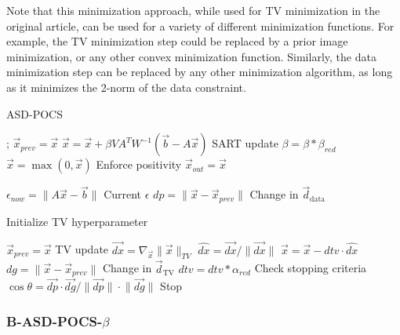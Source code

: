 Note that this minimization approach, while used for TV minimization in the original article, can be used for a variety of different minimization functions. For example, the TV minimization step could be replaced by a prior image minimization\cite{chen2008prior}, or any other convex minimization function. Similarly, the data minimization step can be replaced by any other minimization algorithm, as long as it minimizes the 2-norm of the data constraint.
\begin{algorithm}

\caption{ASD-POCS
\label{alg:ASD-POCS}}
\begin{algorithmic}[1]
;
\State $\vec{x}_{prev}=\vec{x}$
\State  $\vec{x}=\vec{x}+\beta V A^T W^{-1} (\vec{b}-A\vec{x})$
\Comment SART update
\EndFor
\State $\beta=\beta*\beta_{red}$
\State $\vec{x}=\max(0,\vec{x})$
\Comment Enforce positivity
\State $\vec{x}_{out}=\vec{x}$

\State $\epsilon_{now}=\lVert A\vec{x}-\vec{b}\rVert$
\Comment Current $\epsilon$
\State $dp=\lVert\vec{x}-\vec{x}_{prev}\rVert$
\Comment Change in $\vec{d}_{\text{data}}$

\Comment Initialize TV hyperparameter
\EndIf

\State $\vec{x}_{prev}=\vec{x}$
\State
{}
\Comment TV update
\State $\vec{dx}= \nabla_{\vec{x}} \lVert\vec x \rVert_{TV}$
\State $\hat{dx}=\vec{dx}/\lVert\vec{dx}\rVert$
\State $\vec{x}=\vec{x}-dtv\cdot\hat{dx}$
\EndFor
\State $dg=\lVert\vec{x}-\vec{x}_{prev}\rVert$
\Comment Change in $\vec{d}_{\text{TV}}$
\State $dtv=dtv*\alpha_{red}$
\EndIf
\State
\Comment Check stopping criteria
\State $\cos\theta=\vec{dp}\cdot\vec{dg}/\lVert\vec{dp}\rVert\cdot\lVert\vec{dg}\rVert$
\State Stop
\EndIf
\EndWhile

\end{algorithmic}

\end{algorithm}


\FloatBarrier

\subsubsection{B-ASD-POCS-$\beta$}

